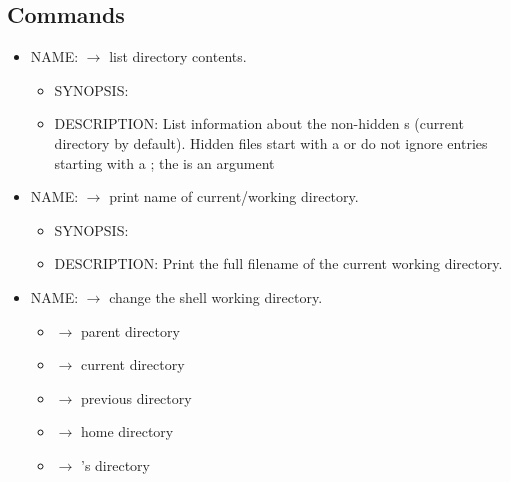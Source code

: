 \subsection{Commands}
\begin{itemize}
      \item NAME\@:  $ \rightarrow $ list directory contents.
            \begin{itemize}
                  \item SYNOPSIS\@: 
                  \item DESCRIPTION\@: List information about the non-hidden s
                        (current directory by default). Hidden files start with a 
                         or  do not ignore entries starting
                        with a ; the  is an argument
            \end{itemize}
      \item NAME\@:  $ \rightarrow $ print name of current/working directory.
            \begin{itemize}
                  \item SYNOPSIS\@: 
                  \item DESCRIPTION\@: Print the full filename of the current working directory.
            \end{itemize}
      \item NAME\@:  $ \rightarrow $ change the shell working directory.
            \begin{itemize}
                  \item {} $ \rightarrow $ parent directory
                  \item {} $ \rightarrow $ current directory
                  \item \code{-} $ \rightarrow $ previous directory
                  \item \code{\textasciitilde} $ \rightarrow $ home directory
                  \item {} $ \rightarrow $ 's directory
            \end{itemize}
\end{itemize}
